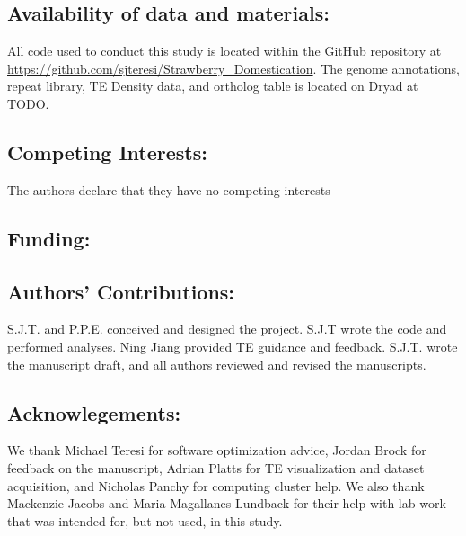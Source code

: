 \documentclass[fleqn,10pt]{olplainarticle}
\begin{document}
\subsection{Availability of data and materials:}
All code used to conduct this study is located within the GitHub repository at \url{https://github.com/sjteresi/Strawberry_Domestication}.
The genome annotations, repeat library, TE Density data, and ortholog table is located on Dryad at TODO.

\subsection{Competing Interests:}
The authors declare that they have no competing interests

\subsection{Funding:}

\subsection{Authors' Contributions:}
S.J.T. and P.P.E. conceived and designed the project.
S.J.T wrote the code and performed analyses.
Ning Jiang provided TE guidance and feedback.
S.J.T. wrote the manuscript draft, and all authors reviewed and revised the manuscripts.

\subsection{Acknowlegements:}
We thank Michael Teresi for software optimization advice, Jordan Brock for feedback on the manuscript, Adrian Platts for TE visualization and dataset acquisition, and Nicholas Panchy for computing cluster help. We also thank Mackenzie Jacobs and Maria Magallanes-Lundback for their help with lab work that was intended for, but not used, in this study.

\newpage

\end{document}
